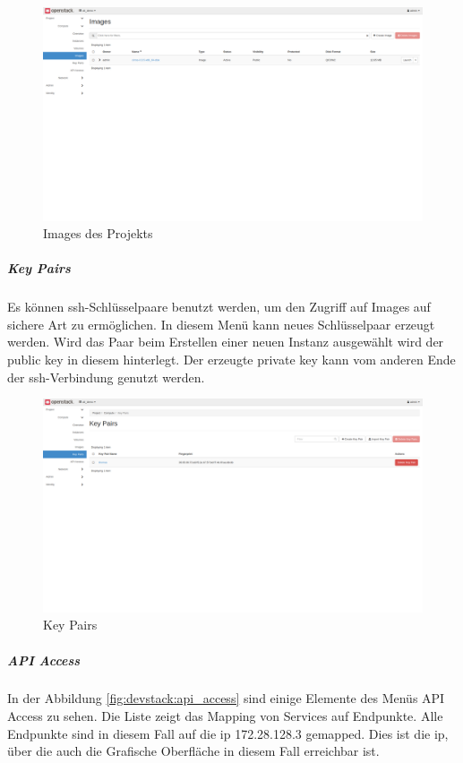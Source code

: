 \documentclass[a4paper,10pt]{article}
\numberwithin{figure}{section}
\numberwithin{table}{section}
\begin{document}
\begin{figure}[htbp]
\centering
\caption{Images des Projekts}
\label{fig:devstack:images}
\includegraphics[width=\textwidth, trim={0 17cm 0 0}, clip]{graphics/devstack/02_Images}
\end{figure}

\subparagraph{Key Pairs}

Es können ssh-Schlüsselpaare benutzt werden, um den Zugriff auf Images auf sichere Art zu ermöglichen.
In diesem Menü kann neues Schlüsselpaar erzeugt werden.
Wird das Paar beim Erstellen einer neuen Instanz ausgewählt wird der public key in diesem hinterlegt.
Der erzeugte private key kann vom anderen Ende der ssh-Verbindung genutzt werden.

\begin{figure}[htbp]
\centering
\caption{Key Pairs}
\label{fig:devstack:key_pairs}
\includegraphics[width=\textwidth, trim={0 17cm 0 0}, clip]{graphics/devstack/03_KeyPairs}
\end{figure}

\subparagraph{API Access}

In der Abbildung \ref{fig:devstack:api_access} sind einige Elemente des Menüs API Access zu sehen.
Die Liste zeigt das Mapping von Services auf Endpunkte.
Alle Endpunkte sind in diesem Fall auf die ip 172.28.128.3 gemapped.
Dies ist die ip, über die auch die Grafische Oberfläche in diesem Fall erreichbar ist.
\end{document}
